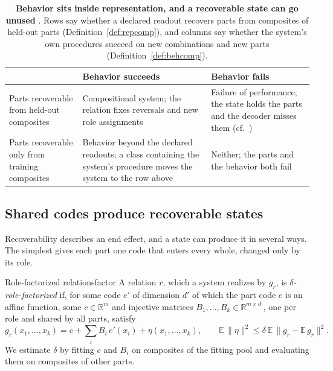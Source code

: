 \documentclass[10pt]{article}
\theoremstyle{plain}
\theoremstyle{remark}
\newcommand{\R}{\mathbb{R}}
\begin{document}
\begin{table}[t]
  \caption{\textbf{Behavior sits inside representation, and a recoverable state can go unused} \citep[cf.][]{vegner2025}. Rows say whether a declared readout recovers parts from composites of held-out parts (Definition~\ref{def:repcomp}), and columns say whether the system's own procedures succeed on new combinations and new parts (Definition~\ref{def:behcomp}).}
  \label{tab:twobytwo}
  \centering\small
  \begin{tabularx}{\linewidth}{@{}P{3.2cm}YY@{}}
    \toprule
    & Behavior succeeds & Behavior fails \\
    \midrule
    Parts recoverable from held-out composites & Compositional system; the relation fixes reversals and new role assignments & Failure of performance; the state holds the parts and the decoder misses them (cf.\ \citealt{montero2021,park2024hidden}) \\
    Parts recoverable only from training composites & Behavior beyond the declared readouts; a class containing the system's procedure moves the system to the row above & Neither; the parts and the behavior both fail \\
    \bottomrule
  \end{tabularx}
\end{table}

\subsection{Shared codes produce recoverable states}
\label{sec:mechanics}

Recoverability describes an end effect, and a state can produce it in several ways. The simplest gives each part one code that enters every whole, changed only by its role.

\begin{defbox}{Role-factorized relations}{factor}
A relation $r$, which a system realizes by $g_r$, is \emph{$\delta$-role-factorized} if, for some code $e'$ of dimension $d'$ of which the part code $e$ is an affine function, some $c \in \R^m$ and injective matrices $B_1, \ldots, B_k \in \R^{m \times d'}$, one per role and shared by all parts, satisfy
\begin{equation}
  g_r(x_1, \ldots, x_k) = c + \textstyle\sum_{i} B_i\, e'(x_i) + \eta(x_1, \ldots, x_k), \qquad \mathbb{E}\,\lVert \eta \rVert^2 \le \delta\, \mathbb{E}\,\lVert g_r - \mathbb{E}\,g_r \rVert^2 .
  \label{eq:factor}
\end{equation}
We estimate $\delta$ by fitting $c$ and $B_i$ on composites of the fitting pool and evaluating them on composites of other parts.
\end{defbox}
\end{document}
